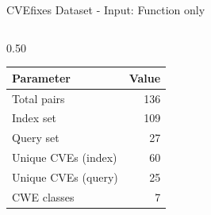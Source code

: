 \documentclass[aspectratio=169,10pt]{beamer}
\begin{document}
\begin{frame}{CVEfixes Dataset - Input: Function only}
\begin{columns}[T]
\begin{column}{0.50\textwidth}
\begin{center}
  {\scriptsize
  \renewcommand{\arraystretch}{1.2}
  \begin{tabular}{lr}
    \toprule
    \textbf{Parameter} & \textbf{Value} \\
    \midrule
    Total pairs & 136 \\
    Index set & 109 \\
    Query set & 27 \\
    Unique CVEs (index) & 60 \\
    Unique CVEs (query) & 25 \\
    CWE classes & 7 \\
    \bottomrule
  \end{tabular}}

    \end{center}
  
\end{column}
\end{columns}
\end{frame}
\end{document}
